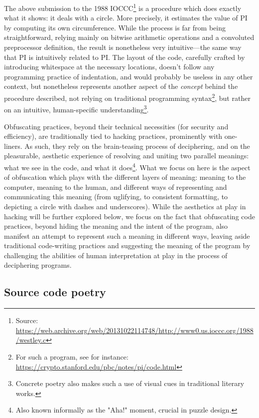 \documentclass{article}
\begin{document}
\pagebreak
[language=C, Caption="r.c, 1988"]

The above submission to the 1988 IOCCC\footnote{Source: \url{https://web.archive.org/web/20131022114748/http://www0.us.ioccc.org/1988/westley.c}} is a procedure which does exactly what it shows: it deals with a circle. More precisely, it estimates the value of PI by computing its own circumference. While the process is far from being straightforward, relying mainly on bitwise arithmetic operations and a convoluted preprocessor definition, the result is nonetheless very intuitive—the same way that PI is intuitively related to PI. The layout of the code, carefully crafted by introducing whitespace at the necessary locations, doesn't follow any programming practice of indentation, and would probably be useless in any other context, but nonetheless represents another aspect of the \emph{concept} behind the procedure described, not relying on traditional programming syntax\footnote{For such a program, see for instance: \url{https://crypto.stanford.edu/pbc/notes/pi/code.html}}, but rather on an intuitive, human-specific understanding\footnote{Concrete poetry also makes such a use of visual cues in traditional literary works.}.

Obfuscating practices, beyond their technical necessities (for security and efficiency), are traditionally tied to hacking practices, prominently with one-liners. As such, they rely on the brain-teasing process of deciphering, and on the pleasurable, aesthetic experience of resolving and uniting two parallel meanings: what we see in the code, and what it does\footnote{Also known informally as the "Aha!" moment, crucial in puzzle design.}. What we focus on here is the aspect of obfuscation which plays with the different layers of meaning: meaning to the computer, meaning to the human, and different ways of representing and communicating this meaning (from uglifying, to consistent formatting, to depicting a circle with dashes and underscores). While the aesthetics at play in hacking will be further explored below, we focus on the fact that obfuscating code practices, beyond hiding the meaning and the intent of the program, also manifest an attempt to represent such a meaning in different ways, leaving aside traditional code-writing practices and suggesting the meaning of the program by challenging the abilities of human interpretation at play in the process of deciphering programs.

\subsection{Source code poetry}
\end{document}
